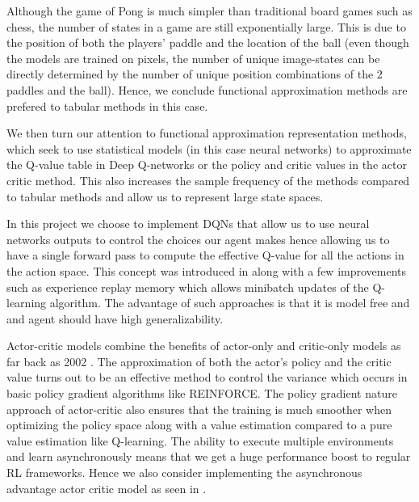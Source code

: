 Although the game of Pong is much simpler than traditional board games such as chess, the number of states in a game are still exponentially large. This is due to the position of both the players' paddle and the location of the ball (even though the models are trained on pixels, the number of unique image-states can be directly determined by the number of unique position combinations of the 2 paddles and the ball). Hence, we conclude functional approximation methods are prefered to tabular methods in this case.

\medskip
\noindent
We then turn our attention to functional approximation representation methods, which seek to use statistical models (in this case neural networks) to approximate the Q-value table in Deep Q-networks or the policy and critic values in the actor critic method. This also increases the sample frequency of the methods compared to tabular methods and allow us to represent large state spaces.

\medskip
\noindent
In this project we choose to implement DQNs that allow us to use neural networks outputs to control the choices our agent makes hence allowing us to have a single forward pass to compute the effective Q-value for all the actions in the action space. This concept was introduced in \cite{Atari_Breakout} along with a few improvements such as experience replay memory which allows minibatch updates of the Q-learning algorithm. The advantage of such approaches is that it is model free and and agent should have high generalizability.

\medskip
\noindent
Actor-critic models combine the benefits of actor-only and critic-only models as far back as 2002 \cite{orig_a3c}. The approximation of both the actor's policy and the critic value turns out to be an effective method to control the variance which occurs in basic policy gradient algorithms like REINFORCE. The policy gradient nature approach of actor-critic also ensures that the training is much smoother when optimizing the policy space along with a value estimation compared to a pure value estimation like Q-learning. The ability to execute multiple environments and learn asynchronously means that we get a huge performance boost to regular RL frameworks. Hence we also consider implementing the asynchronous advantage actor critic model as seen in \cite{A3C}.